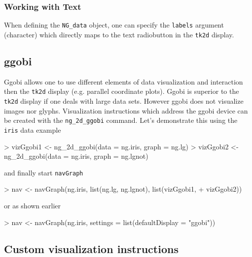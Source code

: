 \documentclass[12pt,oneside,titlepage,letter]{article}
\begin{document}
\subsubsection{Working with Text}
When defining the \texttt{NG\_data} object, one can specify the \texttt{labels} argument (character) which directly maps to the text radiobutton in the \texttt{tk2d} display.



\subsection{ggobi}
Ggobi allows one to use different elements of data visualization and interaction then the \texttt{tk2d} display (e.g. parallel coordinate plots). Ggobi is superior to the \texttt{tk2d} display if one deals with large data sets. However ggobi does not visualize images nor glyphs. Visualization instructions which address the ggobi device can be created with the \texttt{ng\_2d\_ggobi} command. Let's demonstrate this using the \texttt{iris} data example

\begin{Schunk}
\begin{Sinput}
> vizGgobi1 <- ng_2d_ggobi(data = ng.iris, graph = ng.lg)
> vizGgobi2 <- ng_2d_ggobi(data = ng.iris, graph = ng.lgnot)
\end{Sinput}
\end{Schunk}
and finally start \texttt{navGraph}
\begin{Schunk}
\begin{Sinput}
> nav <- navGraph(ng.iris, list(ng.lg, ng.lgnot), list(vizGgobi1, 
+     vizGgobi2))
\end{Sinput}
\end{Schunk}
or as shown earlier
\begin{Schunk}
\begin{Sinput}
> nav <- navGraph(ng.iris, settings = list(defaultDisplay = "ggobi"))
\end{Sinput}
\end{Schunk}


\subsection{Custom visualization instructions}
\end{document}

